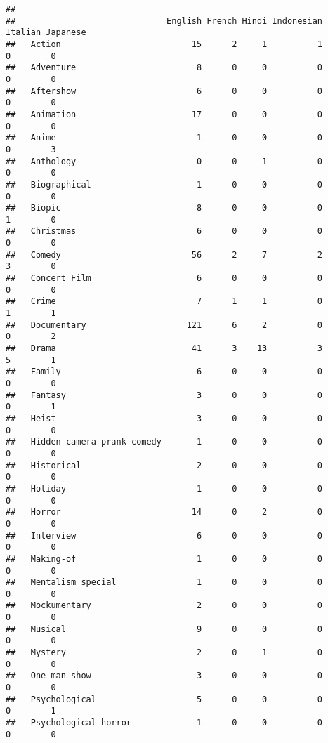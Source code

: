 \documentclass[
]{article}
\begin{document}
\begin{verbatim}
##                             
##                              English French Hindi Indonesian Italian Japanese
##   Action                          15      2     1          1       0        0
##   Adventure                        8      0     0          0       0        0
##   Aftershow                        6      0     0          0       0        0
##   Animation                       17      0     0          0       0        0
##   Anime                            1      0     0          0       0        3
##   Anthology                        0      0     1          0       0        0
##   Biographical                     1      0     0          0       0        0
##   Biopic                           8      0     0          0       1        0
##   Christmas                        6      0     0          0       0        0
##   Comedy                          56      2     7          2       3        0
##   Concert Film                     6      0     0          0       0        0
##   Crime                            7      1     1          0       1        1
##   Documentary                    121      6     2          0       0        2
##   Drama                           41      3    13          3       5        1
##   Family                           6      0     0          0       0        0
##   Fantasy                          3      0     0          0       0        1
##   Heist                            3      0     0          0       0        0
##   Hidden-camera prank comedy       1      0     0          0       0        0
##   Historical                       2      0     0          0       0        0
##   Holiday                          1      0     0          0       0        0
##   Horror                          14      0     2          0       0        0
##   Interview                        6      0     0          0       0        0
##   Making-of                        1      0     0          0       0        0
##   Mentalism special                1      0     0          0       0        0
##   Mockumentary                     2      0     0          0       0        0
##   Musical                          9      0     0          0       0        0
##   Mystery                          2      0     1          0       0        0
##   One-man show                     3      0     0          0       0        0
##   Psychological                    5      0     0          0       0        1
##   Psychological horror             1      0     0          0       0        0

\end{verbatim}
\end{document}
